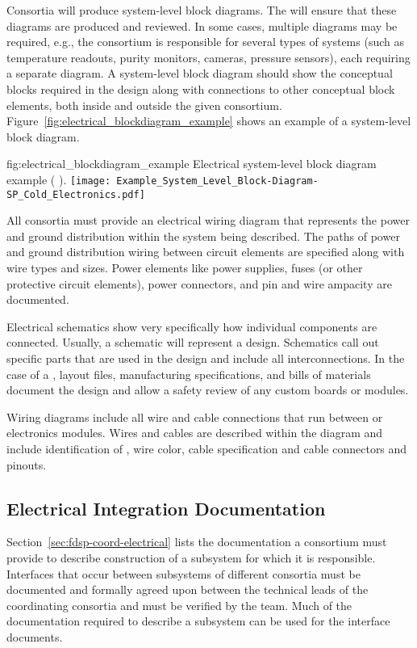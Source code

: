 Consortia will produce system-level block diagrams. The 
will ensure that these diagrams are produced and reviewed.  In some
cases, multiple diagrams may be required, e.g., the 
consortium is responsible for several types of systems (such as
temperature readouts, purity monitors, cameras, pressure sensors),
each requiring a separate diagram. A system-level block diagram should
show the conceptual blocks required in the design along with
connections to other conceptual block elements, both inside and
outside the given consortium.
Figure~\ref{fig:electrical_blockdiagram_example} shows an example of a
system-level block diagram.
\begin{dunefigure}{fig:electrical_blockdiagram_example}
  {Electrical system-level block diagram example ( ).}
 \texttt{[image: Example\_System\_Level\_Block-Diagram-SP\_Cold\_Electronics.pdf]}
\end{dunefigure}


All consortia must provide an electrical wiring diagram that 
represents the power and ground distribution within the system being
described.  The paths of power and ground distribution wiring between
circuit elements are specified along with wire types and sizes.  Power
elements like power supplies, fuses (or other protective circuit
elements), power connectors, and pin and wire ampacity are documented.


Electrical schematics show very specifically how individual
components are connected.  Usually, a schematic will represent a
 design.  Schematics call out specific
parts that are used in the design and include all interconnections.
In the case of a , layout files, manufacturing
specifications, and bills of materials document
the design and allow a safety review of any custom boards or
modules.


Wiring diagrams include all wire and cable connections that run
between  or electronics modules.  Wires and
cables are described within the diagram and include identification of
, wire color, cable specification and
cable connectors and pinouts.


\subsection{Electrical Integration Documentation}
\label{sec:fdsp-coord-integ-electrical}

Section~\ref{sec:fdsp-coord-electrical} lists the documentation a consortium must provide
to describe construction of a subsystem for which it is responsible. Interfaces that occur
between subsystems of different consortia must be documented and formally agreed
upon between the technical leads of the coordinating consortia and
must be verified by the  team.  Much of the
documentation required to describe a subsystem can be used for the interface documents.

